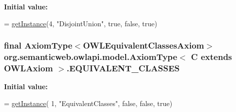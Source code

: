 {\bfseries Initial value\-:}
\begin{DoxyCode}
= \hyperlink{classorg_1_1semanticweb_1_1owlapi_1_1model_1_1_axiom_type_3_01_c_01extends_01_o_w_l_axiom_01_4_a485e011845434c518471707a87f09339}{getInstance}(4,
            \textcolor{stringliteral}{"DisjointUnion"}, \textcolor{keyword}{true}, \textcolor{keyword}{false}, \textcolor{keyword}{true})
\end{DoxyCode}
\hypertarget{classorg_1_1semanticweb_1_1owlapi_1_1model_1_1_axiom_type_3_01_c_01extends_01_o_w_l_axiom_01_4_a0cca873dad6332da5bdd4ec0d6f9784d}{
\subsubsection[{E\-Q\-U\-I\-V\-A\-L\-E\-N\-T\-\_\-\-C\-L\-A\-S\-S\-E\-S}]{\setlength{\rightskip}{0pt plus 5cm}final {\bf Axiom\-Type}$<${\bf O\-W\-L\-Equivalent\-Classes\-Axiom}$>$ org.\-semanticweb.\-owlapi.\-model.\-Axiom\-Type$<$ C extends {\bf O\-W\-L\-Axiom} $>$.E\-Q\-U\-I\-V\-A\-L\-E\-N\-T\-\_\-\-C\-L\-A\-S\-S\-E\-S\hspace{0.3cm}{\ttfamily [static]}}}\label{classorg_1_1semanticweb_1_1owlapi_1_1model_1_1_axiom_type_3_01_c_01extends_01_o_w_l_axiom_01_4_a0cca873dad6332da5bdd4ec0d6f9784d}
{\bfseries Initial value\-:}
\begin{DoxyCode}
= \hyperlink{classorg_1_1semanticweb_1_1owlapi_1_1model_1_1_axiom_type_3_01_c_01extends_01_o_w_l_axiom_01_4_a485e011845434c518471707a87f09339}{getInstance}(
            1, \textcolor{stringliteral}{"EquivalentClasses"}, \textcolor{keyword}{false}, \textcolor{keyword}{false}, \textcolor{keyword}{true})
\end{DoxyCode}
